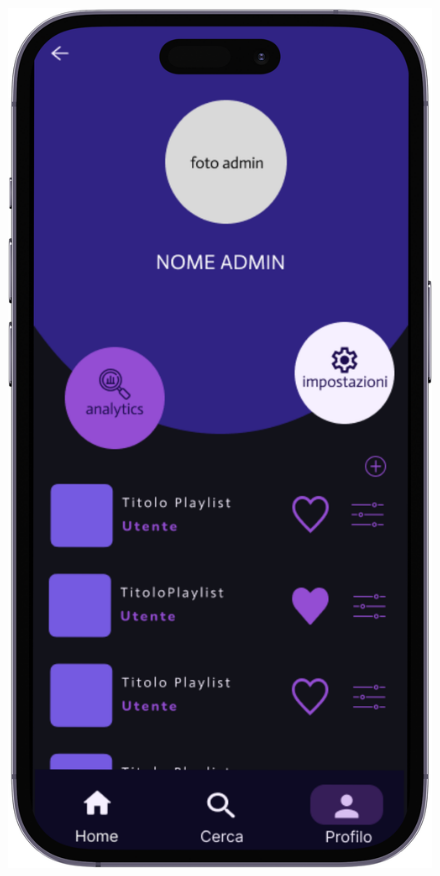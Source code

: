 \documentclass{article}
\begin{document}
\begin{figure}[htbp]
\begin{minipage}{0.18\textwidth}
					\includegraphics[width=\textwidth]{foto6}
				\end{minipage}
				\hfill
				\begin{minipage}{0.18\textwidth}

\end{minipage}
\end{figure}
\end{document}
